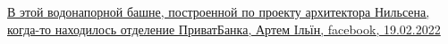  
 
 
 
 

\qqSecCmt

\href{https://www.facebook.com/IlyinArtem/posts/pfbid028SBRz1T6mDKEkRBixk4qFu2hLRhLj7quHMWYuHJBueFN7S9EpwKvAJjj4A4XhsQyl}{%
В этой водонапорной башне, построенной по проекту архитектора Нильсена, когда-то находилось отделение ПриватБанка, %
Артем Ільїн, facebook, 19.02.2022%
}
